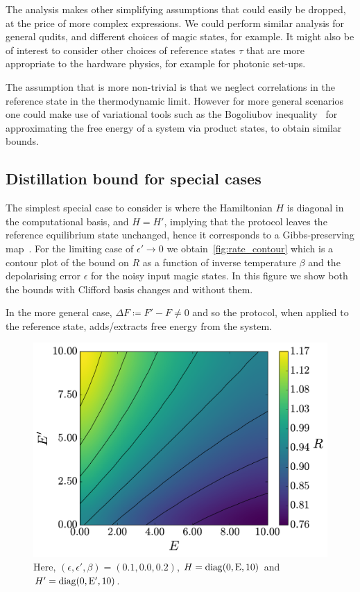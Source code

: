 \documentclass[pra,
aps,
twocolumn,
superscriptaddress,
groupedaddress,
nofootinbib,
reprint
]{revtex4-1}
\begin{document}
The analysis makes other simplifying assumptions that could easily be dropped, at the price of more complex expressions. We could perform similar analysis for general qudits, and different choices of magic states, for example. It might also be of interest to consider other choices of reference states $\tau$ that are more appropriate to the hardware physics, for example for photonic set-ups.

The assumption that is more non-trivial is that we neglect correlations in the reference state in the thermodynamic limit. However for more general scenarios one could make use of variational tools such as the Bogoliubov inequality~\cite{bogolyubov_1966} for approximating the free energy of a system via product states, to obtain similar bounds.





\subsection{Distillation bound for special cases}

The simplest special case to consider is where the Hamiltonian $H$ is diagonal in the computational basis, and $H=H'$, implying that the protocol leaves the reference equilibrium state unchanged, hence it corresponds to a Gibbs-preserving map~\cite{faist_2015}. For the limiting case of $\epsilon' \rightarrow 0$ we obtain~\cref{fig:rate_contour} which is a contour plot of the bound on $R$ as a function of inverse temperature $\beta$ and the depolarising error $\epsilon$ for the noisy input magic states. In this figure we show both the bounds with Clifford basis changes and without them. 


In the more general case, $\Delta F \coloneqq F' - F \ne 0$ and so the protocol, when applied to the reference state, adds/extracts free energy from the system. 



\begin{figure}
    \centering
    \includegraphics[scale=0.4]{figs/test/R_vs_E1.pdf}
    \caption{Here, $(\epsilon, \epsilon', \beta) = (0.1, 0.0, 0.2)$, $H = \rm{diag}(0,E,10)$ and $H' = \rm{diag}(0,E',10)$.
    }
    \label{fig:rvse1}
\end{figure}
\end{document}
